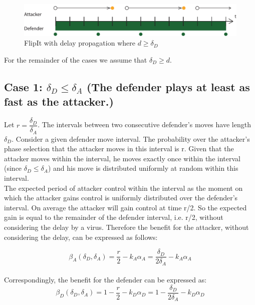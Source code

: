 \begin{figure}[hbtp]
\centering
\includegraphics[scale=0.7]{Images/FlipItCase1delaytobig.pdf} 
\caption{FlipIt with delay propagation where $ d \geq \delta_{D}$ }
\label{langeredelay}
\end{figure}

For the remainder of the cases we assume that $\delta_{D} \geq d$.

\subsection*{\textbf{Case 1:} $\delta_{D} \leq \delta_{A} $ (The defender plays at least as fast as the attacker.) }

Let $r = \dfrac{\delta_{D}}{ \delta_{A} }$. The intervals between two consecutive defender's moves have length $\delta_{D}$. Consider a given defender move interval. The probability over the attacker's phase selection that the attacker moves in this interval is r. Given that the attacker moves within the interval, he moves exactly once within the interval (since $\delta_{D} \leq \delta_{A} $) and his move is distributed uniformly at random within this interval. \\

The expected period of attacker control within the interval as the moment on which the attacker gains control is uniformly distributed over the defender's interval. On average the attacker will gain control at time r/2. So the expected gain is equal to the remainder of the defender interval, i.e. r/2, without considering the delay by a virus. Therefore the benefit for the attacker, without considering the delay, can be expressed as follows:

\begin{equation*}
\beta_{A}(\delta_{D},\delta_{A}) =\dfrac {r} {2} - k_{A} \alpha_{A} = \dfrac {\delta_{D}} {2\delta_{A}} - k_{A} \alpha_{A}  
\end{equation*}\\

Correspondingly, the benefit for the defender can be expressed as:
\begin{equation*}
\beta_{D}(\delta_{D},\delta_{A}) =1 -  \dfrac {r} {2} - k_{D} \alpha_{D} = 1 - \dfrac {\delta_{D}} {2\delta_{A}} - k_{D} \alpha_{D} 
\end{equation*}


